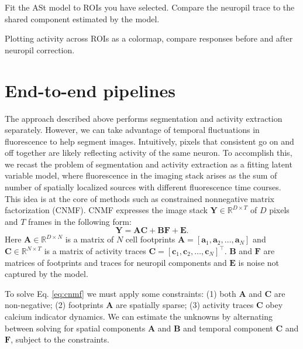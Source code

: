 \documentclass[a4paper]{report}
\newcommand{\nexercise}[0]{\arabic{exercises}\addtocounter{exercises}{1}}
\begin{document}
\begin{exercisebox}[frametitle={Exercise \nexercise: Neuropil correction}]
Fit the ASt model to ROIs you have selected.
Compare the neuropil trace to the shared component estimated by the model.

Plotting activity across ROIs as a colormap, compare responses before and after neuropil correction.
\end{exercisebox}

\section{End-to-end pipelines}
The approach described above performs segmentation and activity extraction separately. 
However, we can take advantage of temporal fluctuations in fluorescence to help segment images. 
Intuitively, pixels that consistent go on and off together are likely reflecting activity of the same neuron. 
To accomplish this, we recast the problem of segmentation and activity extraction as a fitting latent variable model, where fluorescence in the imaging stack arises as the sum of number of spatially localized sources with different fluorescence time courses.
This idea is at the core of methods such as constrained nonnegative matrix factorization (CNMF).
CNMF expresses the image stack $\mathbf{Y} \in \mathbb { R } ^ { D \times T }$ of $D$ pixels and $T$ frames in the following form:
\begin{equation}
	\mathbf{Y} = \mathbf{AC} + \mathbf{BF} + \mathbf{E}.
	\label{eq:cnmf}
\end{equation}
Here $\mathbf{A} \in \mathbb { R } ^ { D \times N }$ is a matrix of $N$ cell footprints $\mathbf{A} = [ \mathbf { a } _ { 1 } , \mathbf { a } _ { 2 } , \ldots , \mathbf { a } _ { N } ]$ and $\mathbf{C} \in \mathbb { R } ^ { N \times T }$ is a matrix of activity traces $\mathbf{C} = [ \mathbf { c } _ { 1 } , \mathbf { c } _ { 2 } , \ldots , \mathbf { c } _ { N } ] ^ { \top }$. 
$\mathbf{B}$ and $\mathbf{F}$ are matrices of footprints and traces for neuropil components and $\mathbf{E}$ is noise not captured by the model.

To solve Eq. \ref{eq:cnmf} we must apply some constraints: (1) both $\mathbf{A}$ and $\mathbf{C}$ are non-negative; (2) footprints $\mathbf{A}$ are spatially sparse; (3) activity traces $\mathbf{C}$ obey calcium indicator dynamics. We can estimate the unknowns by alternating between solving for spatial components $\mathbf{A}$ and $\mathbf{B}$ and temporal component $\mathbf{C}$ and $\mathbf{F}$, subject to the constraints.
\end{document}

